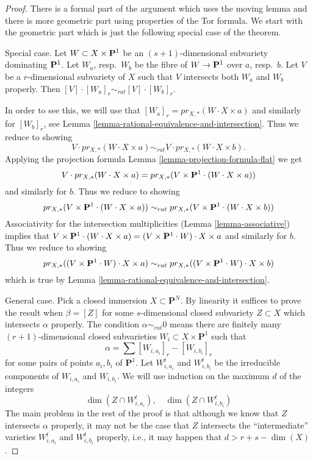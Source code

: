 \begin{proof}
There is a formal part of the argument which uses the moving lemma
and there is more geometric part using properties of the Tor formula.
We start with the geometric part which is just the following
special case of the theorem.

\medskip\noindent
Special case. Let $W \subset X \times {\bf P}^1$ be an $(s + 1)$-dimensional
subvariety dominating ${\bf P}^1$. Let $W_a$, resp.\ $W_b$ be the fibre of
$W \to {\bf P}^1$ over $a$, resp.\ $b$. Let $V$ be a $r$-dimensional
subvariety of $X$ such that $V$ intersects both $W_a$ and
$W_b$ properly. Then $[V] \cdot [W_a]_r \sim_{rat} [V] \cdot [W_b]_r$.

\medskip\noindent
In order to see this, we will use that
$[W_a]_r = pr_{X,*}(W \cdot X \times a)$ and similarly for $[W_b]_r$, see
Lemma \ref{lemma-rational-equivalence-and-intersection}.
Thus we reduce to showing
$$
V \cdot pr_{X,*}( W \cdot X \times a) \sim_{rat} V \cdot
pr_{X,*}( W \cdot X\times b).
$$
Applying the projection formula
Lemma \ref{lemma-projection-formula-flat} we get
$$
V \cdot pr_{X,*}( W \cdot X\times a) =
pr_{X,*}(V \times {\bf P}^1 \cdot (W \cdot X\times a))
$$
and similarly for $b$. Thus we reduce to showing
$$
pr_{X,*}(V \times {\bf P}^1 \cdot (W \cdot X\times a))
\sim_{rat}
pr_{X,*}(V \times {\bf P}^1 \cdot (W \cdot X\times b))
$$
Associativity for the intersection multiplicities
(Lemma \ref{lemma-associative})
implies that $V \times \mathbf{P}^1 \cdot (W \cdot X\times a) =
(V \times {\bf P}^1 \cdot W) \cdot X \times a$
and similarly for $b$.  Thus we reduce to showing
$$
pr_{X,*}((V \times {\bf P}^1 \cdot W) \cdot X\times a)
\sim_{rat}
pr_{X,*}((V \times {\bf P}^1 \cdot W) \cdot X\times b)
$$
which is true by Lemma \ref{lemma-rational-equivalence-and-intersection}.

\medskip\noindent
General case. Pick a closed immersion $X \subset \mathbf{P}^N$.
By linearity it suffices to prove the result when $\beta = [Z]$ for some
$s$-dimensional closed subvariety $Z \subset X$ which intersects $\alpha$
properly. The condition $\alpha \sim_{rat} 0$ means there
are finitely many $(r + 1)$-dimensional closed subvarieties
$W_i \subset X \times \mathbf{P}^1$ such that
$$
\alpha = \sum [W_{i, a_i}]_r - [W_{i, b_i}]_r
$$
for some pairs of points $a_i, b_i$ of $\mathbf{P}^1$.
Let $W_{i, a_i}^t$ and $W_{i, b_i}^t$ be the irreducible components
of $W_{i, a_i}$ and $W_{i, b_i}$.
We will use induction on the maximum $d$ of the integers
$$
\dim(Z \cap W_{i, a_i}^t),\quad \dim(Z \cap W_{i, b_i}^t)
$$
The main problem in the rest of the proof is that although we know that $Z$
intersects $\alpha$ properly, it may not be the case that $Z$ intersects the
``intermediate'' varieties $W_{i, a_i}^t$
and $W_{i, b_i}^t$ properly, i.e., it may happen that $d >  r + s - \dim(X)$.


\end{proof}

